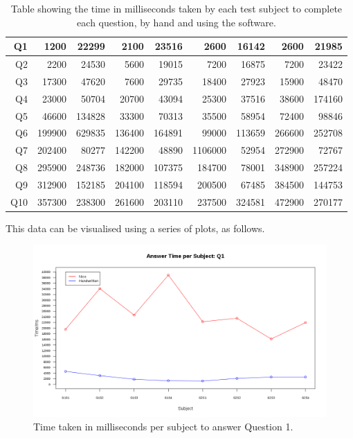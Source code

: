 \documentclass[12pt,twoside,notitlepage,xetex]{report}
\begin{document}
\begin{center}
\begin{table}[H]
\begin{center}
\begin{tabular}{|r||r|r||r|r||r|r||r|r|}
Q1 & 1200 & 22299 & 2100 & 23516 & 2600 & 16142 & 2600 & 21985\\ \hline
Q2 & 2200 & 24530 & 5600 & 19015 & 7200 & 16875 & 7200 & 23422\\ \hline
Q3 & 17300 & 47620 & 7600 & 29735 & 18400 & 27923 & 15900 & 48470\\ \hline
Q4 & 23000 & 50704 & 20700 & 43094 & 25300 & 37516 & 38600 & 174160\\ \hline
Q5 & 46600 & 134828 & 33300 & 70313 & 35500 & 58954 & 72400 & 98846\\ \hline
Q6 & 199900 & 629835 & 136400 & 164891 & 99000 & 113659 & 266600 & 252708\\ \hline
Q7 & 202400 & 80277 & 142200 & 48890 & 1106000 & 52954 & 272900 & 72767\\ \hline
Q8 & 295900 & 248736 & 182000 & 107375 & 184700 & 78001 & 348900 & 257224\\ \hline
Q9 & 312900 & 152185 & 204100 & 118594 & 200500 & 67485 & 384500 & 144753\\ \hline
Q10 & 357300 & 238300 & 261600 & 203110 & 237500 & 324581 & 472900 & 270177\\
\hline
\end{tabular}
\end{center}
\caption{Table showing the time in milliseconds taken by each test subject to complete each question, by hand and using the software.}
\end{table}
\end{center}

This data can be visualised using a series of plots, as follows.

\begin{center}
\begin{figure}[H]
\begin{center}
\includegraphics[width=\textwidth-2cm]{figs/graphs/q1.png}
\end{center}
\caption{Time taken in milliseconds per subject to answer Question 1.}
\end{figure}
\end{center}
\end{document}
